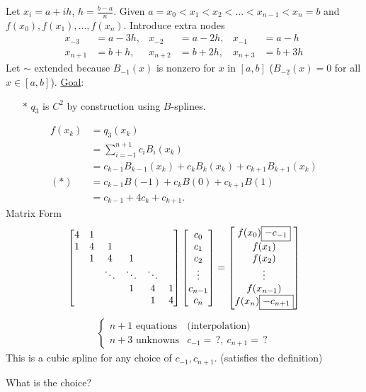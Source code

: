 \documentclass[]{article}
\begin{document}
Let $x_i=a+ih$, $h=\frac{b-a}n$.
Given $a = x_0 < x_1 < x_2 < \dots < x_{n-1} < x_n = b$ and $f(x_0),f(x_1),\dots,f(x_n)$.
Introduce extra  nodes
\begin{align*}
	x_{-3} &= a-3h, & x_{-2} &= a-2h, & x_{-1} &= a-h \\
	x_{n+1} &= b+h, & x_{n+2} &= b+2h, & x_{n+3} &= b+3h
\end{align*}
Let  $\sim$ extended because $B_{-1}(x)$ is nonzero for $x$ in $[a,b]$ ($B_{-2}(x)=0$ for all $x\in[a,b]$).
\ul{Goal}: 
\begin{enumerate}
	\item[$*$] $q_3$ is $C^2$ by construction using $B$-splines.
\end{enumerate}
\begin{align*}
	f(x_k) &= q_3(x_k) \\
		   &= \sum_{i=-1}^{n+1} c_i B_i(x_k) \\
		   &= c_{k-1} B_{k-1}(x_k) + c_k B_k(x_k) + c_{k+1} B_{k+1}(x_k) \\
	(*)    &= c_{k-1} B(-1) + c_k B(0) + c_{k+1} B(1) \\
		   &= c_{k-1} + 4 c_k + c_{k+1}.
\end{align*}
Matrix Form
$$ \begin{bmatrix}
	4 & 1 & & & & \\
	1 & 4 & 1 & & & \\
	  & 1 & 4 & 1 &  &\\
	  &   & \ddots & \ddots & \ddots & \\
	  &   &   &  1 & 4 & 1 \\
	  &   &   &    & 1 & 4\end{bmatrix} \begin{bmatrix}c_0\\c_1\\c_2\\\vdots\\c_{n-1}\\c_n\end{bmatrix} = \begin{bmatrix}f(x_0) \fbox{$-c_{-1}$} \\ f(x_1) \\ f(x_2) \\ \vdots \\ f(x_{n-1}) \\ f(x_n)\fbox{$-c_{n+1}$}\end{bmatrix} $$
\begin{align*}
	\begin{cases}
		n+1 \text{ equations} & \text{(interpolation)} \\
		n+3 \text{ unknowns} & c_{-1} = \, ?,\ c_{n+1} = \, ?
	\end{cases}
\end{align*}
This is a cubic spline for any choice of $c_{-1},c_{n+1}$.
(satisfies the definition)
\begin{question}
	What is the  choice?
\end{question}
\end{document}
